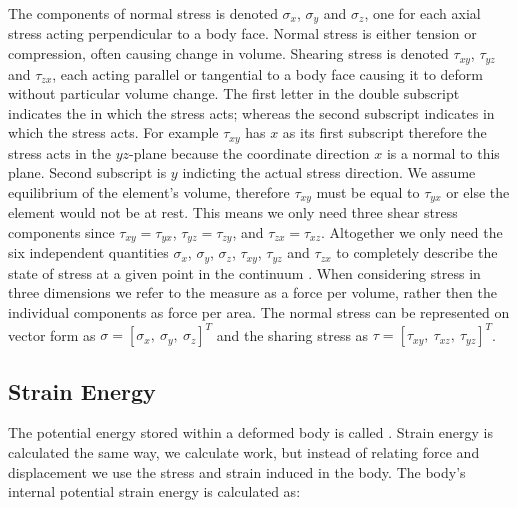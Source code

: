 The components of normal stress is denoted $\sigma_x$,
$\sigma_y$ and $\sigma_z$, one for each axial stress acting
perpendicular to a body face. Normal stress is either tension or
compression, often causing change in volume. Shearing stress is
denoted $\tau_{xy}$, $\tau_{yz}$ and $\tau_{zx}$, each
acting parallel or tangential to a body face causing it
to deform without particular volume change.
The first letter in the double subscript
indicates the  in which the stress acts; whereas the second
subscript indicates in which  the stress
acts.
For example $\tau_{xy}$ has $x$ as its first
subscript therefore the stress acts in the $yz$-plane because the
coordinate direction $x$ is a normal to this plane. Second subscript
is $y$ indicting the actual stress direction.
%
We assume equilibrium of the element's volume, therefore $\tau_{xy}$
must be equal to $\tau_{yx}$ or else the element would not be at
rest. This means we only need three shear stress components since
$\tau_{xy} = \tau_{yx}$, $\tau_{yz} = \tau_{zy}$, and $\tau_{zx} =
\tau_{xz}$.
Altogether we only need the six independent quantities $\sigma_x$,
$\sigma_y$, $\sigma_z$, $\tau_{xy}$, $\tau_{yz}$ and $\tau_{zx}$ to completely
describe the state of stress at a given point in the
continuum .
%
When considering stress in three dimensions we refer to the measure as
a force per volume, rather then the individual components as force per
area. The normal stress can be represented on vector form as
$\sigma = [ \sigma_{x}, \ \sigma_{y}, \ \sigma_{z} ]^T$ and the
sharing stress as 
$\tau = [ \tau_{xy}, \ \tau_{xz}, \ \tau_{yz} ]^T$.

\subsection{Strain Energy}
The potential energy stored within a deformed body is called . Strain energy is calculated the same way, we calculate
work, but instead of relating force and displacement we use the stress
and strain induced in the body. The body's internal potential strain
energy is calculated as:

